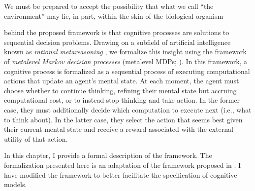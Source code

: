 \begin{savequote}[75mm]
We must be prepared to accept the possibility that what we call ``the environment'' may lie, in part, within the skin of the biological organism
\end{savequote}

\label{sec:metamdp}

 behind the proposed framework is that cognitive processes are solutions to sequential decision problems. Drawing on a subfield of artificial intelligence known as \emph{rational metareasoning} \citep{matheson1968economic,russell1991principles}, we formalize this insight using the framework of \emph{metalevel Markov decision processes} (metalevel MDPs; \citealp{hay2012selecting}). In this framework, a cognitive process is formalized as a sequential process of executing computational actions that update an agent's mental state. At each moment, the agent must choose whether to continue thinking, refining their mental state but accruing computational cost, or to instead stop thinking and take action. In the former case, they must additionally decide which computation to execute next (i.e., what to think about). In the latter case, they select the action that seems best given their current mental state and receive a reward associated with the external utility of that action.


In this chapter, I provide a formal description of the framework. The formalization presented here is an adaptation of the framework proposed in \citet{hay2016principles}. I have modified the framework to better facilitate the specification of cognitive models.


